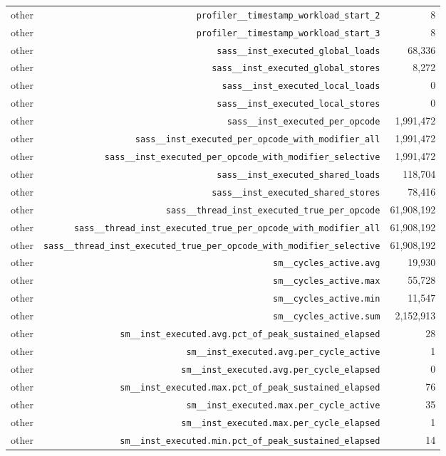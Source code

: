 \begin{table}[h]
\begin{tabular}{|l|r|r|}
other & \texttt{profiler__timestamp_workload_start_2} & 8 \\
other & \texttt{profiler__timestamp_workload_start_3} & 8 \\
other & \texttt{sass__inst_executed_global_loads} & 68,336 \\
other & \texttt{sass__inst_executed_global_stores} & 8,272 \\
other & \texttt{sass__inst_executed_local_loads} & 0 \\
other & \texttt{sass__inst_executed_local_stores} & 0 \\
other & \texttt{sass__inst_executed_per_opcode} & 1,991,472 \\
other & \texttt{sass__inst_executed_per_opcode_with_modifier_all} & 1,991,472 \\
other & \texttt{sass__inst_executed_per_opcode_with_modifier_selective} & 1,991,472 \\
other & \texttt{sass__inst_executed_shared_loads} & 118,704 \\
other & \texttt{sass__inst_executed_shared_stores} & 78,416 \\
other & \texttt{sass__thread_inst_executed_true_per_opcode} & 61,908,192 \\
other & \texttt{sass__thread_inst_executed_true_per_opcode_with_modifier_all} & 61,908,192 \\
other & \texttt{sass__thread_inst_executed_true_per_opcode_with_modifier_selective} & 61,908,192 \\
other & \texttt{sm__cycles_active.avg} & 19,930 \\
other & \texttt{sm__cycles_active.max} & 55,728 \\
other & \texttt{sm__cycles_active.min} & 11,547 \\
other & \texttt{sm__cycles_active.sum} & 2,152,913 \\
other & \texttt{sm__inst_executed.avg.pct_of_peak_sustained_elapsed} & 28 \\
other & \texttt{sm__inst_executed.avg.per_cycle_active} & 1 \\
other & \texttt{sm__inst_executed.avg.per_cycle_elapsed} & 0 \\
other & \texttt{sm__inst_executed.max.pct_of_peak_sustained_elapsed} & 76 \\
other & \texttt{sm__inst_executed.max.per_cycle_active} & 35 \\
other & \texttt{sm__inst_executed.max.per_cycle_elapsed} & 1 \\
other & \texttt{sm__inst_executed.min.pct_of_peak_sustained_elapsed} & 14 \\

\end{tabular}
\end{table}
